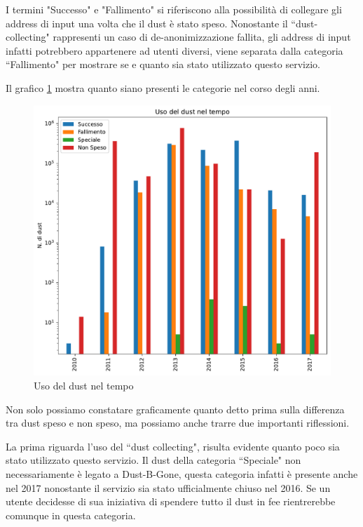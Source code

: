 I termini "Successo" e "Fallimento" si riferiscono alla possibilità di collegare gli address di input una volta che il dust è stato speso. Nonostante il ``dust-collecting" rappresenti un caso di de-anonimizzazione fallita, gli address di input infatti potrebbero appartenere ad utenti diversi, viene separata dalla categoria ``Fallimento" per mostrare se e quanto sia stato utilizzato questo servizio.

Il grafico \ref{fig:dust_year} mostra quanto siano presenti le categorie nel corso degli anni.
\begin{figure}[h!]
    \centering
    \includegraphics[scale=0.6]{Grafici/uso_del_dust_new.pdf}
    \caption{Uso del dust nel tempo}
    \label{fig:dust_year}
\end{figure}
\FloatBarrier

Non solo possiamo constatare graficamente quanto detto prima sulla differenza tra dust speso e non speso, ma possiamo anche trarre due importanti riflessioni. 

La prima riguarda l'uso del ``dust collecting", risulta evidente quanto poco sia stato utilizzato questo servizio. Il dust della categoria ``Speciale" non necessariamente è legato a Dust-B-Gone, questa categoria infatti è presente anche nel 2017 nonostante il servizio sia stato ufficialmente chiuso nel 2016. Se un utente decidesse di sua iniziativa di spendere tutto il dust in fee rientrerebbe comunque in questa categoria.


